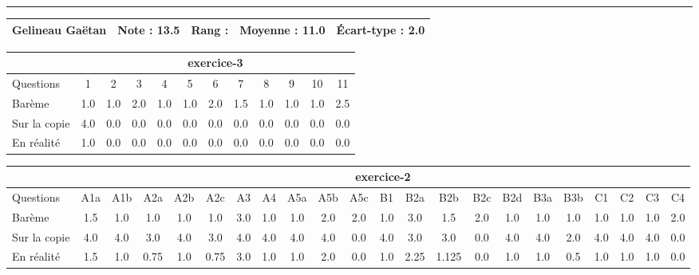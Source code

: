 \documentclass[a4paper, landscape, 10pt]{article}
\begin{document}
\begin{minipage}{\textwidth}
  \end{minipage}
  \vspace{0.3cm}
  \hrule
  \vspace{0.3cm}

  \begin{minipage}{\textwidth}
    { \bf
    \begin{tabular}{|c|*{4}{c|}}
    \hline
      Gelineau Gaëtan & Note : 13.5 & Rang :  & Moyenne : 11.0 & \'Ecart-type : 2.0 \\
    \hline
    \end{tabular}
    }
    
      \begin{tabular}{|l|*{ 11 }{c|}}
        \hline
        & \multicolumn{ 11 }{c|}{ exercice-3 } \\
        \hline
        Questions & 1&2&3&4&5&6&7&8&9&10&11 \\
        \hline
        Barème & 1.0&1.0&2.0&1.0&1.0&2.0&1.5&1.0&1.0&1.0&2.5 \\
        \hline
        Sur la copie & 4.0&0.0&0.0&0.0&0.0&0.0&0.0&0.0&0.0&0.0&0.0 \\
        \hline
        En réalité & 1.0&0.0&0.0&0.0&0.0&0.0&0.0&0.0&0.0&0.0&0.0 \\
        \hline
      \end{tabular}
    
      \begin{tabular}{|l|*{ 21 }{c|}}
        \hline
        & \multicolumn{ 21 }{c|}{ exercice-2 } \\
        \hline
        Questions & A1a&A1b&A2a&A2b&A2c&A3&A4&A5a&A5b&A5c&B1&B2a&B2b&B2c&B2d&B3a&B3b&C1&C2&C3&C4 \\
        \hline
        Barème & 1.5&1.0&1.0&1.0&1.0&3.0&1.0&1.0&2.0&2.0&1.0&3.0&1.5&2.0&1.0&1.0&1.0&1.0&1.0&1.0&2.0 \\
        \hline
        Sur la copie & 4.0&4.0&3.0&4.0&3.0&4.0&4.0&4.0&4.0&0.0&4.0&3.0&3.0&0.0&4.0&4.0&2.0&4.0&4.0&4.0&0.0 \\
        \hline
        En réalité & 1.5&1.0&0.75&1.0&0.75&3.0&1.0&1.0&2.0&0.0&1.0&2.25&1.125&0.0&1.0&1.0&0.5&1.0&1.0&1.0&0.0 \\
        \hline
      \end{tabular}
    

\end{minipage}
\end{document}
